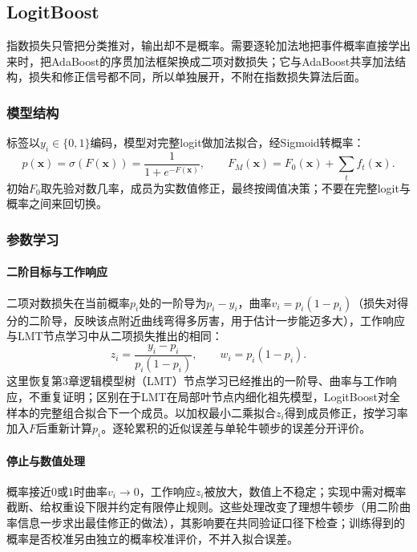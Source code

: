 \subsection{LogitBoost}
\label{sec:ensemble-logitboost}

指数损失只管把分类推对，输出却不是概率。需要逐轮加法地把事件概率直接学出来时，把AdaBoost的序贯加法框架换成二项对数损失；它与AdaBoost共享加法结构，损失和修正信号都不同，所以单独展开，不附在指数损失算法后面。

\subsubsection{模型结构}
标签以$y_i\in\{0,1\}$编码，模型对完整logit做加法拟合，经Sigmoid转概率：
\begin{equation}
  p(\bm x)=\sigma(F(\bm x))=\frac{1}{1+e^{-F(\bm x)}},
  \qquad
  F_M(\bm x)=F_0(\bm x)+\sum_t f_t(\bm x).
  \label{eq:ensemble-logitboost-model}
\end{equation}
初始$F_0$取先验对数几率，成员为实数值修正，最终按阈值决策；不要在完整logit与概率之间来回切换。

\subsubsection{参数学习}

\paragraph{二阶目标与工作响应}
二项对数损失在当前概率$p_i$处的一阶导为$p_i-y_i$，曲率$v_i=p_i(1-p_i)$（损失对得分的二阶导，反映该点附近曲线弯得多厉害，用于估计一步能迈多大），工作响应与LMT节点学习中从二项损失推出的相同：
\begin{equation}
  z_i=\frac{y_i-p_i}{p_i(1-p_i)},\qquad
  w_i=p_i(1-p_i).
  \label{eq:ensemble-logitboost-working}
\end{equation}
这里恢复第3章逻辑模型树（LMT）节点学习已经推出的一阶导、曲率与工作响应，不重复证明；区别在于LMT在局部叶节点内细化祖先模型，LogitBoost对全样本的完整组合拟合下一个成员。以加权最小二乘拟合$z_i$得到成员修正，按学习率加入$F$后重新计算$p_i$。逐轮累积的近似误差与单轮牛顿步的误差分开评价。

\paragraph{停止与数值处理}
概率接近$0$或$1$时曲率$v_i\to0$，工作响应$z_i$被放大，数值上不稳定；实现中需对概率截断、给权重设下限并约定有限停止规则。这些处理改变了理想牛顿步（用二阶曲率信息一步求出最佳修正的做法），其影响要在共同验证口径下检查；训练得到的概率是否校准另由独立的概率校准评价，不并入拟合误差。

